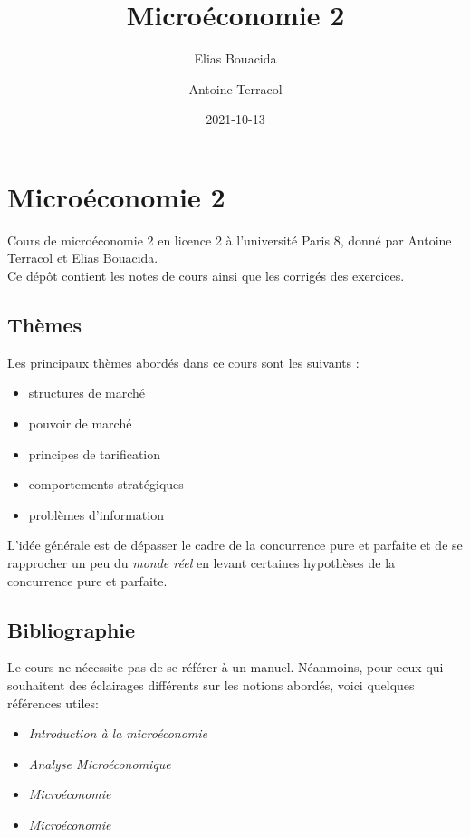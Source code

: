 \documentclass[
]{book}
\title{Microéconomie 2}
\author{Elias Bouacida \and Antoine Terracol}
\date{2021-10-13}
\providecommand{\tightlist}{%
  \setlength{\itemsep}{0pt}\setlength{\parskip}{0pt}}
\theoremstyle{definition}
\theoremstyle{definition}
\theoremstyle{definition}
\theoremstyle{definition}
\theoremstyle{remark}
\begin{document}
\maketitle

{
\setcounter{tocdepth}{1}
\tableofcontents
}
\hypertarget{microuxe9conomie-2}{%
\chapter{Microéconomie 2}\label{microuxe9conomie-2}}

Cours de microéconomie 2 en licence 2 à l'université Paris 8, donné par Antoine Terracol et Elias Bouacida.\\
Ce dépôt contient les notes de cours ainsi que les corrigés des exercices.

\hypertarget{thuxe8mes}{%
\section{Thèmes}\label{thuxe8mes}}

Les principaux thèmes abordés dans ce cours sont les suivants :

\begin{itemize}
\tightlist
\item
  structures de marché
\item
  pouvoir de marché
\item
  principes de tarification
\item
  comportements stratégiques
\item
  problèmes d'information
\end{itemize}

L'idée générale est de dépasser le cadre de la concurrence pure et parfaite et de se rapprocher un peu du \emph{monde réel} en levant certaines hypothèses de la concurrence pure et parfaite.

\hypertarget{bibliographie}{%
\section{Bibliographie}\label{bibliographie}}

Le cours ne nécessite pas de se référer à un manuel.
Néanmoins, pour ceux qui souhaitent des éclairages différents sur les notions abordés, voici quelques références utiles:

\begin{itemize}
\tightlist
\item
  \citet{varian2015} \emph{Introduction à la microéconomie}
\item
  \citet{varian2008} \emph{Analyse Microéconomique}
\item
  \citet{pindyck2012} \emph{Microéconomie}
\item
  \citet{jeleva2014} \emph{Microéconomie}
\end{itemize}
\end{document}
